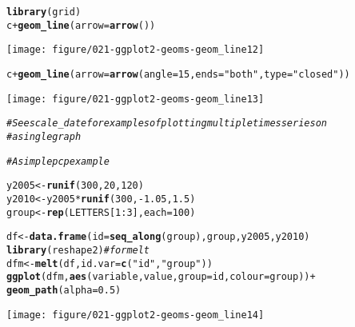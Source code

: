 \documentclass[a4paper,titlepage]{tufte-handout}\usepackage[]{graphicx}\usepackage[]{color}
\makeatletter
\def\maxwidth{ %
  \ifdim\Gin@nat@width>\linewidth
    \linewidth
  \else
    \Gin@nat@width
  \fi
}
\newcommand{\hlnum}[1]{\textcolor[rgb]{0.686,0.059,0.569}{#1}}%
\newcommand{\hlstr}[1]{\textcolor[rgb]{0.192,0.494,0.8}{#1}}%
\newcommand{\hlcom}[1]{\textcolor[rgb]{0.678,0.584,0.686}{\textit{#1}}}%
\newcommand{\hlopt}[1]{\textcolor[rgb]{0,0,0}{#1}}%
\newcommand{\hlstd}[1]{\textcolor[rgb]{0.345,0.345,0.345}{#1}}%
\newcommand{\hlkwb}[1]{\textcolor[rgb]{0.69,0.353,0.396}{#1}}%
\newcommand{\hlkwc}[1]{\textcolor[rgb]{0.333,0.667,0.333}{#1}}%
\newcommand{\hlkwd}[1]{\textcolor[rgb]{0.737,0.353,0.396}{\textbf{#1}}}%
\newenvironment{kframe}{%
 \def\at@end@of@kframe{}%
 \ifinner\ifhmode%
  \def\at@end@of@kframe{\end{minipage}}%
  \begin{minipage}{\columnwidth}%
 \fi\fi%
 \def\FrameCommand##1{\hskip\@totalleftmargin \hskip-\fboxsep
 \colorbox{shadecolor}{##1}\hskip-\fboxsep
     \hskip-\linewidth \hskip-\@totalleftmargin \hskip\columnwidth}%
 \MakeFramed {\advance\hsize-\width
   \@totalleftmargin\z@ \linewidth\hsize
   \@setminipage}}%
 {\par\unskip\endMakeFramed%
 \at@end@of@kframe}
\newenvironment{knitrout}{}{} %
\makeatother
\begin{document}
\begin{knitrout}
\begin{kframe}
\begin{alltt}
\hlkwd{library}\hlstd{(grid)}
\hlstd{c} \hlopt{+} \hlkwd{geom_line}\hlstd{(}\hlkwc{arrow} \hlstd{=} \hlkwd{arrow}\hlstd{())}
\end{alltt}
\end{kframe}
\texttt{[image: figure/021-ggplot2-geoms-geom\_line12]} 
\begin{kframe}\begin{alltt}
\hlstd{c} \hlopt{+} \hlkwd{geom_line}\hlstd{(}\hlkwc{arrow} \hlstd{=} \hlkwd{arrow}\hlstd{(}\hlkwc{angle} \hlstd{=} \hlnum{15}\hlstd{,} \hlkwc{ends} \hlstd{=} \hlstr{"both"}\hlstd{,} \hlkwc{type} \hlstd{=} \hlstr{"closed"}\hlstd{))}
\end{alltt}
\end{kframe}
\texttt{[image: figure/021-ggplot2-geoms-geom\_line13]} 
\begin{kframe}\begin{alltt}
\hlcom{# See scale_date for examples of plotting multiple times series on}
\hlcom{# a single graph}

\hlcom{# A simple pcp example}

\hlstd{y2005} \hlkwb{<-} \hlkwd{runif}\hlstd{(}\hlnum{300}\hlstd{,} \hlnum{20}\hlstd{,} \hlnum{120}\hlstd{)}
\hlstd{y2010} \hlkwb{<-} \hlstd{y2005} \hlopt{*} \hlkwd{runif}\hlstd{(}\hlnum{300}\hlstd{,} \hlopt{-}\hlnum{1.05}\hlstd{,} \hlnum{1.5}\hlstd{)}
\hlstd{group} \hlkwb{<-} \hlkwd{rep}\hlstd{(LETTERS[}\hlnum{1}\hlopt{:}\hlnum{3}\hlstd{],} \hlkwc{each} \hlstd{=} \hlnum{100}\hlstd{)}

\hlstd{df} \hlkwb{<-} \hlkwd{data.frame}\hlstd{(}\hlkwc{id} \hlstd{=} \hlkwd{seq_along}\hlstd{(group), group, y2005, y2010)}
\hlkwd{library}\hlstd{(reshape2)} \hlcom{# for melt}
\hlstd{dfm} \hlkwb{<-} \hlkwd{melt}\hlstd{(df,} \hlkwc{id.var} \hlstd{=} \hlkwd{c}\hlstd{(}\hlstr{"id"}\hlstd{,} \hlstr{"group"}\hlstd{))}
\hlkwd{ggplot}\hlstd{(dfm,} \hlkwd{aes}\hlstd{(variable, value,} \hlkwc{group} \hlstd{= id,} \hlkwc{colour} \hlstd{= group))} \hlopt{+}
  \hlkwd{geom_path}\hlstd{(}\hlkwc{alpha} \hlstd{=} \hlnum{0.5}\hlstd{)}
\end{alltt}
\end{kframe}
\texttt{[image: figure/021-ggplot2-geoms-geom\_line14]} 
\begin{kframe}\begin{alltt}


\end{alltt}
\end{kframe}
\end{knitrout}
\end{document}
